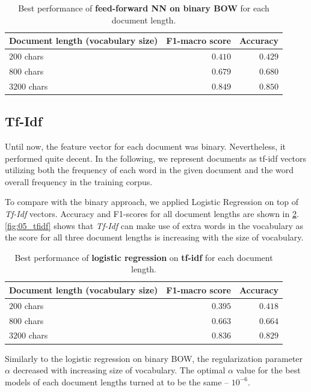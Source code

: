 \begin{table}[h]
	\centering
	\begin{tabular}{|l|r|r|}\hline
		Document length (vocabulary size) & F1-macro score & Accuracy \\
		\hline
		$200$ chars  &  $0.410$   & $0.429$   \\
		$800$ chars  &  $0.679$   & $0.680$   \\
		$3200$ chars &  $0.849$   & $0.850$   \\
		\hline
	\end{tabular}
	\caption{Best performance of \textbf{feed-forward NN on binary BOW} for each document length.}
	\label{tbl:bow_nn}
\end{table}

\subsection{Tf-Idf}
Until now, the feature vector for each document was binary. Nevertheless, it performed quite decent. In the following, we represent documents as tf-idf vectors utilizing both the frequency of each word in the given document and the word overall frequency in the training corpus.

To compare with the binary approach, we applied Logistic Regression on top of \textit{Tf-Idf} vectors. Accuracy and F1-scores for all document lengths are shown in \cref{tbl:tfidf}. \cref{fig:05_tfidf} shows that \textit{Tf-Idf} can make use of extra words in the vocabulary as the score for all three document lengths is increasing with the size of vocabulary.

\begin{table}[h]
	\centering
	\begin{tabular}{|l|r|r|}\hline
		Document length (vocabulary size) & F1-macro score & Accuracy \\
		\hline
		$200$ chars  &  $0.395$   & $0.418$   \\
		$800$ chars  &  $0.663$   & $0.664$   \\
		$3200$ chars &  $0.836$   & $0.829$   \\
		\hline
	\end{tabular}
	\caption{Best performance of \textbf{logistic regression} on \textbf{tf-idf} for each document length.}
	\label{tbl:tfidf}
\end{table}

Similarly to the logistic regression on binary BOW, the regularization parameter $\alpha$ decreased with increasing size of vocabulary. The optimal $\alpha$ value for the best models of each document lengths turned at to be the same -- $10 ^{-6}$.

